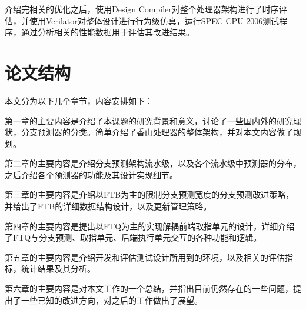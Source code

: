 介绍完相关的优化之后，使用Design Compiler对整个处理器架构进行了时序评估，并使用Verilator对整体设计进行行为级仿真，运行SPEC CPU 2006测试程序，通过分析相关的性能数据用于评估其改进结果。

\section{论文结构}

本文分为以下几个章节，内容安排如下：

第一章的主要内容是介绍了本课题的研究背景和意义，讨论了一些国内外的研究现状，分支预测器的分类。简单介绍了香山处理器的整体架构，并对本文内容做了规划。

第二章的主要内容是介绍分支预测架构流水级，以及各个流水级中预测器的分布，之后介绍各个预测器的功能及其设计实现细节。

第三章的主要内容是介绍以FTB为主的限制分支预测宽度的分支预测改进策略，并给出了FTB的详细数据结构设计，以及更新管理策略。

第四章的主要内容是提出以FTQ为主的实现解耦前端取指单元的设计，详细介绍了FTQ与分支预测、取指单元、后端执行单元交互的各种功能和逻辑。


第五章的主要内容是介绍开发和评估测试设计所用到的环境，以及相关的评估指标，统计结果及其分析。

第六章的主要内容是对本文工作的一个总结，并指出目前仍然存在的一些问题，提出了一些已知的改进方向，对之后的工作做出了展望。

